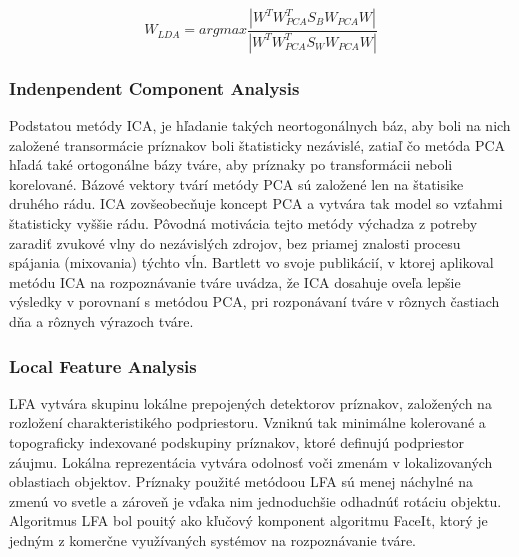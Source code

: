 \begin{equation}\label{eqn:fisher}
	W_{LDA} = arg max \frac{|W^T W_{PCA}^T S_B W_{PCA} W|}{|W^T W_{PCA}^T S_W W_{PCA} W|}
\end{equation}

\subsubsection{Indenpendent Component Analysis}
Podstatou metódy ICA, je hľadanie takých neortogonálnych báz,
aby boli na nich založené transormácie príznakov boli štatisticky nezávislé, zatiaľ čo
metóda PCA hľadá také ortogonálne bázy tváre, aby príznaky po transformácii neboli korelované\cite{handbookbio}.
Bázové vektory tvárí metódy PCA sú založené len na štatisike druhého rádu.
ICA zovšeobecňuje koncept PCA a vytvára tak model so vzťahmi štatisticky vyššie rádu.
Pôvodná motivácia tejto metódy výchadza z potreby zaradiť zvukové vlny do nezávislých zdrojov, bez priamej znalosti procesu spájania
(mixovania) týchto vĺn\cite{handbookbio}. Bartlett vo svoje publikácií\cite{bartlett2002face}, v ktorej aplikoval metódu ICA
na rozpoznávanie tváre uvádza, že ICA dosahuje oveľa lepšie výsledky v porovnaní s metódou PCA, pri rozponávaní tváre
v rôznych častiach dňa a rôznych výrazoch tváre.

\subsubsection{Local Feature Analysis}
LFA vytvára skupinu lokálne prepojených detektorov príznakov, založených na rozložení charakteristikého podpriestoru.
Vzniknú tak minimálne kolerované a topograficky indexované podskupiny príznakov, ktoré definujú podpriestor záujmu.
Lokálna reprezentácia vytvára odolnosť voči zmenám v lokalizovaných oblastiach objektov.
Príznaky použité metódoou LFA sú menej náchylné na zmenú vo svetle a zároveň je vďaka nim jednoduchšie odhadnúť
rotáciu objektu.
Algoritmus LFA bol pouitý ako kľučový komponent algoritmu FaceIt, ktorý je jedným z komerčne využívaných
systémov na rozpoznávanie tváre.\cite{handbookbio}


